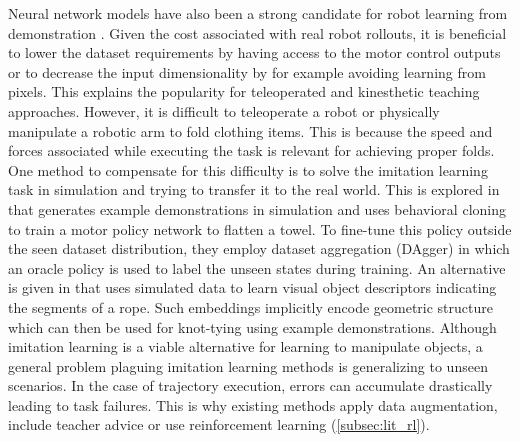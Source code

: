 \documentclass[\home/main.tex]{subfiles}
\begin{document}
Neural network models have also been a strong candidate for robot learning from demonstration \autocite{Ravichandar2020}. Given the cost associated with real robot rollouts, it is beneficial to lower the dataset requirements by having access to the motor control outputs or to decrease the input dimensionality by for example avoiding learning from pixels. This explains the popularity for teleoperated \autocite{Zhang2018,Duan2017} and kinesthetic teaching \autocite{finn2017one} approaches. However, it is difficult to teleoperate a robot or physically manipulate a robotic arm to fold clothing items. This is because the speed and forces associated while executing the task is relevant for achieving proper folds. One method to compensate for this difficulty is to solve the imitation learning task in simulation and trying to transfer it to the real world. This is explored in \autocite{Seita2020} that generates example demonstrations in simulation and uses behavioral cloning to train a motor policy network to flatten a towel. To fine-tune this policy outside the seen dataset distribution, they employ dataset aggregation (DAgger) in which an oracle policy is used to label the unseen states during training. An alternative is given in \autocite{Sundaresan2020} that uses simulated data to learn visual object descriptors indicating the segments of a rope. Such embeddings implicitly encode geometric structure which can then be used for knot-tying using example demonstrations.
Although imitation learning is a viable alternative for learning to manipulate objects, a general problem plaguing imitation learning methods is generalizing to unseen scenarios. In the case of trajectory execution, errors can accumulate drastically leading to task failures. This is why existing methods apply data augmentation, include teacher advice or use reinforcement learning (\cref{subsec:lit_rl}).
\end{document}
